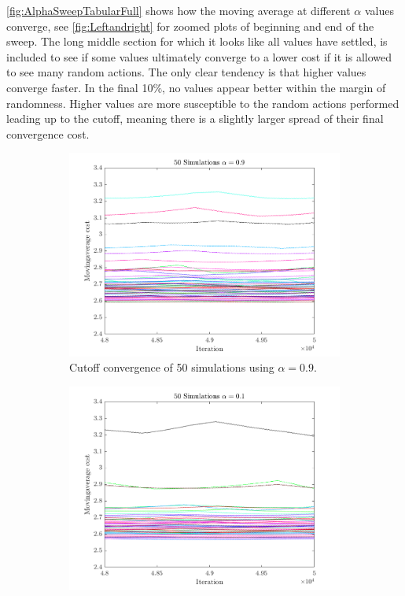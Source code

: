 \cref{fig:AlphaSweepTabularFull} shows how the moving average at different $\alpha$ values converge, see \cref{fig:Leftandright} for zoomed plots of beginning and end of the sweep. The long middle section for which it looks like all values have settled, is included to see if some values ultimately converge to a lower cost if it is allowed to see many random actions. The only clear tendency is that higher values converge faster.
In the final 10$\%$, no values appear better within the margin of randomness. Higher values are more susceptible to the random actions performed leading up to the cutoff, meaning there is a slightly larger spread of their final convergence cost.

\begin{figure}
	\centering
	\begin{subfigure}{.5\textwidth}
		\centering
		\includegraphics[width=1\linewidth]{figures/50plot09.pdf}
		\caption{Cutoff convergence of 50 simulations using $\alpha = 0.9$.}
		\label{fig:50plot09}
	\end{subfigure}%
	\begin{subfigure}{.5\textwidth}
		\centering
		\includegraphics[width=1\linewidth]{figures/50plot01.pdf}

\end{subfigure}
\end{figure}
